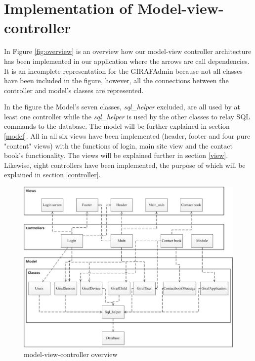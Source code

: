 \section{Implementation of Model-view-controller}
In Figure \vref{fig:overview} is an overview how our model-view controller architecture has been implemented in our application where the arrows are call dependencies. It is an incomplete representation for the GIRAFAdmin because not all classes have been included in the figure, however, all the connections between the controller and model's classes are represented. 

In the figure the Model's seven classes, \emph{sql\_helper} excluded, are all used by at least one controller while the \emph{sql\_helper} is used by the other classes to relay SQL commands to the database. The model will be further explained in section \vref{model}. All in all six views have been implemented (header, footer and four pure "content" views) with the functions of login, main site view and the contact book's functionality. The views will be explained further in section \vref{view}. Likewise, eight controllers have been implemented, the purpose of which will be explained in section \vref{controller}.

\begin{figure}
	\centering
		\includegraphics[width=1.00\textwidth]{img/overview.jpg}
	\caption{model-view-controller overview}
	\label{fig:overview}
\end{figure}
